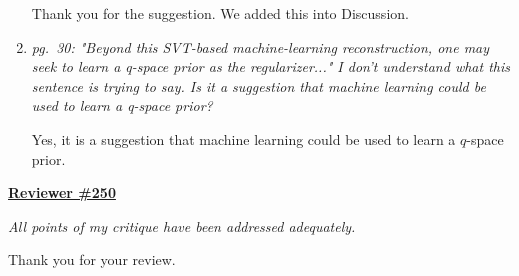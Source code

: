 \documentclass[a4paper,11pt,twoside]{report}
\begin{document}
\begin{enumerate}[resume]
    \hspace{1em} {\color{blue} Thank you for the suggestion.
    We added this into Discussion.}

    \item \textit{pg.~30: "Beyond this SVT-based machine-learning reconstruction, one may seek to learn a q-space prior as the regularizer..." I don't understand what this sentence is trying to say. Is it a suggestion that machine learning could be used to learn a q-space prior?}

    \hspace{1em} {\color{blue} Yes, it is a suggestion that machine learning
    could be used to learn a $q$-space prior.}
\end{enumerate}


\clearpage
\noindent \underline{\textbf{Reviewer \#250}}

\textit{All points of my critique have been addressed adequately.}

\hspace{1em} {\color{blue} Thank you for your review.}
\end{document}
